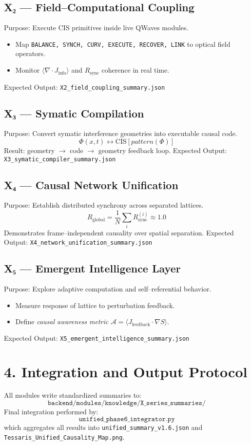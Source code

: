 \documentclass[11pt,a4paper]{article}
\begin{document}
\subsection*{X₂ — Field--Computational Coupling}
Purpose: Execute CIS primitives inside live QWaves modules.
\begin{itemize}
  \item Map \texttt{BALANCE, SYNCH, CURV, EXECUTE, RECOVER, LINK} to optical field operators.
  \item Monitor $\langle \nabla\!\cdot\!J_{\mathrm{info}}\rangle$ and $R_{\mathrm{sync}}$ coherence in real time.
\end{itemize}
Expected Output: \texttt{X2\_field\_coupling\_summary.json}

\subsection*{X₃ — Symatic Compilation}
Purpose: Convert symatic interference geometries into executable causal code.
\[
\Phi(x,t) \leftrightarrow \text{CIS}[pattern(\Phi)]
\]
Result: geometry $\rightarrow$ code $\rightarrow$ geometry feedback loop.
Expected Output: \texttt{X3\_symatic\_compiler\_summary.json}

\subsection*{X₄ — Causal Network Unification}
Purpose: Establish distributed synchrony across separated lattices.
\[
R_{\mathrm{global}} = \frac{1}{N}\sum_i R_{\mathrm{sync}}^{(i)} \approx 1.0
\]
Demonstrates frame--independent causality over spatial separation.  
Expected Output: \texttt{X4\_network\_unification\_summary.json}

\subsection*{X₅ — Emergent Intelligence Layer}
Purpose: Explore adaptive computation and self--referential behavior.
\begin{itemize}
  \item Measure response of lattice to perturbation feedback.
  \item Define \emph{causal awareness metric} $\mathcal{A} = \langle J_{\mathrm{feedback}}\cdot\nabla S \rangle$.
\end{itemize}
Expected Output: \texttt{X5\_emergent\_intelligence\_summary.json}

\section{4. Integration and Output Protocol}
All modules write standardized summaries to:
\[
\texttt{backend/modules/knowledge/X\_series\_summaries/}
\]
Final integration performed by:
\[
\texttt{unified\_phase6\_integrator.py}
\]
which aggregates all results into \texttt{unified\_summary\_v1.6.json} and \texttt{Tessaris\_Unified\_Causality\_Map.png}.
\end{document}
